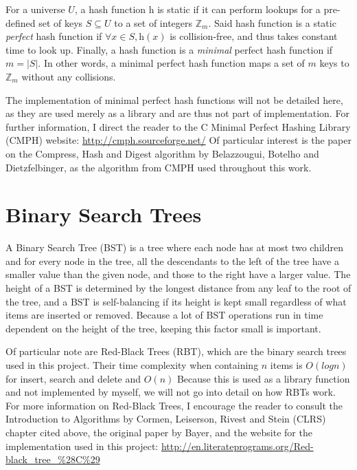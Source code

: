 \documentclass[ %
                    author={Dominic Joseph Moylett},
                    degree={MEng},
                     title={Dictionary Matching with Fingerprints},
                  subtitle={An Empirical Analysis},
                      type={Research},
                      year={2014} ]{dissertation}
\begin{document}
For a universe $U$, a hash function $\text{h}$ is static if it can perform lookups for a pre-defined set of keys $S \subseteq U$ to a set of integers $\mathbb{Z}_m$. Said hash function is a static \textit{perfect} hash function if $\forall x \in S, \text{h}(x)$ is collision-free, and thus takes constant time to look up. Finally, a hash function is a \textit{minimal} perfect hash function if $m = |S|$. In other words, a minimal perfect hash function maps a set of $m$ keys to $\mathbb{Z}_m$ without any collisions.

The implementation of minimal perfect hash functions will not be detailed here, as they are used merely as a library and are thus not part of implementation. For further information, I direct the reader to the C Minimal Perfect Hashing Library (CMPH) website: \url{http://cmph.sourceforge.net/} Of particular interest is the paper on the Compress, Hash and Digest algorithm by Belazzougui, Botelho and Dietzfelbinger\cite{belazzougui:chd}, as the algorithm from CMPH used throughout this work.

\section{Binary Search Trees}
A Binary Search Tree (BST)\cite{clrs:bst} is a tree where each node has at most two children and for every node in the tree, all the descendants to the left of the tree have a smaller value than the given node, and those to the right have a larger value. The height of a BST is determined by the longest distance from any leaf to the root of the tree, and a BST is self-balancing if its height is kept small regardless of what items are inserted or removed. Because a lot of BST operations run in time dependent on the height of the tree, keeping this factor small is important.

Of particular note are Red-Black Trees (RBT)\cite{clrs:rbt}, which are the binary search trees used in this project. Their time complexity when containing $n$ items is $O(log n)$ for insert, search and delete and $O(n)$ Because this is used as a library function and not implemented by myself, we will not go into detail on how RBTs work. For more information on Red-Black Trees, I encourage the reader to consult the Introduction to Algorithms by Cormen, Leiserson, Rivest and Stein (CLRS) chapter cited above, the original paper by Bayer\cite{bayer:rbt}, and the website for the implementation used in this project: \url{http://en.literateprograms.org/Red-black_tree_%28C%29}
\end{document}
